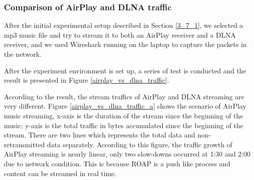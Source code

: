 \subsubsection{Comparison of AirPlay and DLNA traffic\label{4_1_1}}
After the initial experimental setup described in Section \ref{3_7_1}, we selected a mp3 music file and try to stream it to both an AirPlay receiver and a DLNA receiver, and we used Wireshark running on the laptop to capture the packets in the network.

After the experiment environment is set up, a series of test is conducted and the result is presented in Figure \ref{airplay_vs_dlna_traffic}.

According to the result, the stream traffics of AirPlay and DLNA streaming are very different. Figure \ref{airplay_vs_dlna_traffic_a} shows the scenario of AirPlay music streaming, x-axis is the duration of the stream since the beginning of the music; y-axis is the
total traffic in bytes accumulated since the beginning of the stream. There are two lines which represents the total data and non-retransmitted data separately. According to this figure, the
traffic growth of AirPlay streaming is nearly linear, only two slow-downs occurred at 1:30 and 2:00 due to network condition. This is because ROAP is a push like process and content can be streamed in real time.

